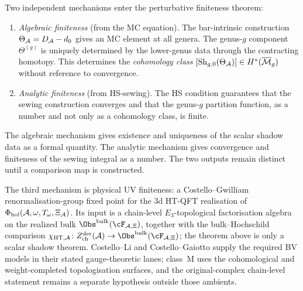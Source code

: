 \begin{remark}
Two independent mechanisms enter the perturbative finiteness theorem:
\begin{enumerate}[label=\textup{(\roman*)}]
\item \emph{Algebraic finiteness} (from the MC equation). The bar-intrinsic construction $\Theta_{\mathcal{A}} = D_{\mathcal{A}} - d_0$ gives an MC element at all genera. The genus-$g$ component $\Theta^{(g)}$ is uniquely determined by the lower-genus data through the contracting homotopy. This determines the \emph{cohomology class} $[\operatorname{Sh}_{g,0}(\Theta_{\mathcal{A}})] \in H^*(\overline{\mathcal{M}}_g)$ without reference to convergence.
\item \emph{Analytic finiteness} (from HS-sewing). The HS condition guarantees that the sewing construction converges and that the genus-$g$ partition function, as a number and not only as a cohomology class, is finite.
\end{enumerate}
The algebraic mechanism gives existence and uniqueness of the scalar
shadow data as a formal quantity. The analytic mechanism gives
convergence and finiteness of the sewing integral as a number. The two
outputs remain distinct until a comparison map is constructed.
\end{remark}

\begin{remark}
\label{rem:thqg-I-three-mechanisms}
The third mechanism is physical UV finiteness: a Costello--Gwilliam
renormalisation-group fixed point for the $3$d HT-QFT realisation of
\(\Phi_{\mathrm{hol}}(\mathcal{A},\omega,T_\omega,\Xi_{\mathcal{A}})\). Its input is a
chain-level $E_3$-topological factorisation algebra on the realized
bulk
\(\Obs^{\mathrm{bulk}}(\cF_{\cA,\Xi})\), together with the
bulk--Hochschild comparison
\(\chi_{\mathrm{HT},\cA}\colon
Z^{\mathrm{der}}_{\mathrm{ch}}(\cA)\to
\Obs^{\mathrm{bulk}}(\cF_{\cA,\Xi})\); the theorem above is only a
scalar shadow theorem. Costello--Li and Costello--Gaiotto supply the
required BV models in their stated gauge-theoretic lanes; class~M uses
the cohomological and weight-completed topologisation surfaces, and the
original-complex chain-level statement remains a separate hypothesis
outside those ambients.
\end{remark}

